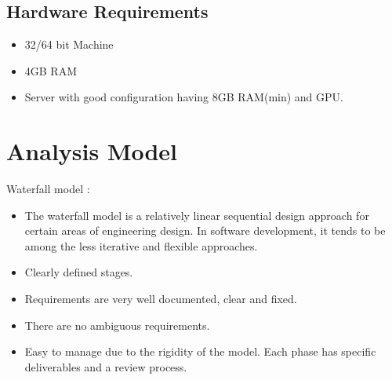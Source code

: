 \documentclass[oneside,a4paper,12pt]{book}
\begin{document}
\subsection{Hardware Requirements}

\setlength{\parskip}{0.0pt}
\begin{itemize}
	\item 32/64 bit Machine\par

	\item 4GB RAM\par

\setlength{\parskip}{9.96pt}
	\item Server with good configuration having 8GB RAM(min) and GPU.
\end{itemize}\par




\section{Analysis Model}

\begin{justify}
Waterfall model :
\end{justify}\par

\setlength{\parskip}{0.0pt}
\begin{itemize}
	\item The waterfall model is a relatively linear sequential design approach for certain areas of engineering design. In software development, it tends to be among the less iterative and flexible approaches.\par

	\item Clearly defined stages.\par

	\item Requirements are very well documented, clear and fixed.\par

	\item There are no ambiguous requirements.\par

	\item Easy to manage due to the rigidity of the model. Each phase has specific deliverables and a review process.\par
\end{itemize}
\end{document}
